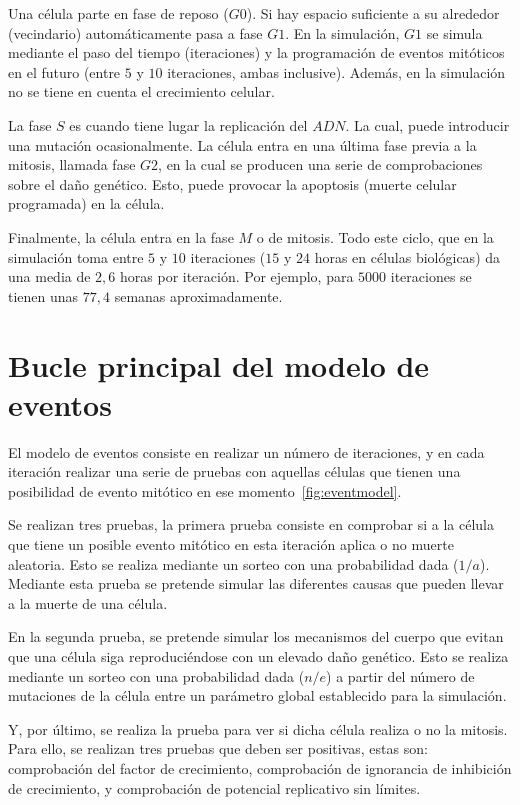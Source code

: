 Una célula parte en fase de reposo ($G0$). Si hay espacio suficiente a su alrededor (vecindario) automáticamente pasa
a fase $G1$. En la simulación, $G1$ se simula mediante el paso del tiempo (iteraciones) y la programación de
eventos mitóticos en el futuro (entre $5$ y $10$ iteraciones, ambas inclusive). Además, en la simulación no se
tiene en cuenta el crecimiento celular.

La fase $S$ es cuando tiene lugar la replicación del $ADN$. La cual, puede introducir una mutación ocasionalmente.
La célula entra en una última fase previa a la mitosis, llamada fase $G2$, en la cual se producen una serie
de comprobaciones sobre el daño genético. Esto, puede provocar la apoptosis (muerte celular programada) en la célula.

Finalmente, la célula entra en la fase $M$ o de mitosis. Todo este ciclo, que en la simulación toma entre $5$ y $10$ iteraciones
($15$ y $24$ horas en células biológicas) da una media de $2,6$ horas por iteración. Por ejemplo, para $5000$ iteraciones se tienen
unas $77,4$ semanas aproximadamente.

\section{Bucle principal del modelo de eventos}

El modelo de eventos consiste en realizar un número de iteraciones, y en cada iteración realizar
una serie de pruebas con aquellas células que tienen una posibilidad de evento mitótico en ese
momento~\ref{fig:eventmodel}.

Se realizan tres pruebas, la primera prueba consiste en comprobar si a la célula que tiene
un posible evento mitótico en esta iteración aplica o no muerte aleatoria. Esto se realiza mediante un
sorteo con una probabilidad dada ($1/a$). Mediante esta prueba se pretende simular las diferentes
causas que pueden llevar a la muerte de una célula.

En la segunda prueba, se pretende simular los mecanismos del cuerpo que evitan que una célula
siga reproduciéndose con un elevado daño genético. Esto se realiza mediante un sorteo con una probabilidad
dada ($n/e$) a partir del número de mutaciones de la célula entre un parámetro global establecido para
la simulación.

Y, por último, se realiza la prueba para ver si dicha célula realiza o no la mitosis.
Para ello, se realizan tres pruebas que deben ser positivas, estas son: comprobación del factor de crecimiento,
comprobación de ignorancia de inhibición de crecimiento, y comprobación de potencial replicativo sin límites.

